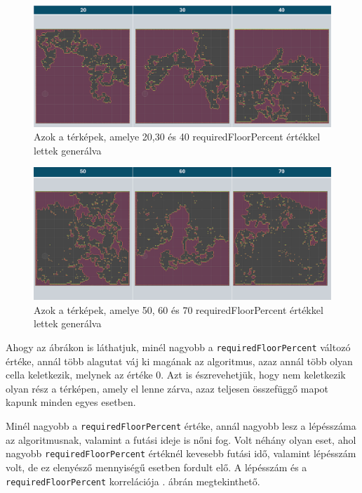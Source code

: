 \begin{figure}[ht]
\centering
\includegraphics[width = \textwidth]{images/lowpercentrandomwalk.png}
\caption{Azok a térképek, amelye 20,30 és 40 requiredFloorPercent értékkel lettek generálva}
\label{fig:lowpercentrandomwalk}
\end{figure}

\begin{figure}[ht]
\centering
\includegraphics[width = \textwidth]{images/highpercentrandomwalk.png}
\caption{Azok a térképek, amelye 50, 60 és 70 requiredFloorPercent értékkel lettek generálva}
\label{fig:highpercentrandomwalk}
\end{figure}

\newpage
Ahogy az ábrákon is láthatjuk, minél nagyobb a \texttt{requiredFloorPercent} változó értéke, annál több alagutat váj ki magának az algoritmus, azaz annál több olyan cella keletkezik, melynek az értéke 0. Azt is észrevehetjük, hogy nem keletkezik olyan rész a térképen, amely el lenne zárva, azaz teljesen összefüggő mapot kapunk minden egyes esetben.

Minél nagyobb a \texttt{requiredFloorPercent} értéke, annál nagyobb lesz a lépésszáma az algoritmusnak, valamint a futási ideje is nőni fog. Volt néhány olyan eset, ahol nagyobb \texttt{requiredFloorPercent} értéknél kevesebb futási idő, valamint lépésszám volt, de ez elenyésző mennyiségű esetben fordult elő. A lépésszám és a \texttt{requiredFloorPercent} korrelációja . ábrán megtekinthető.

